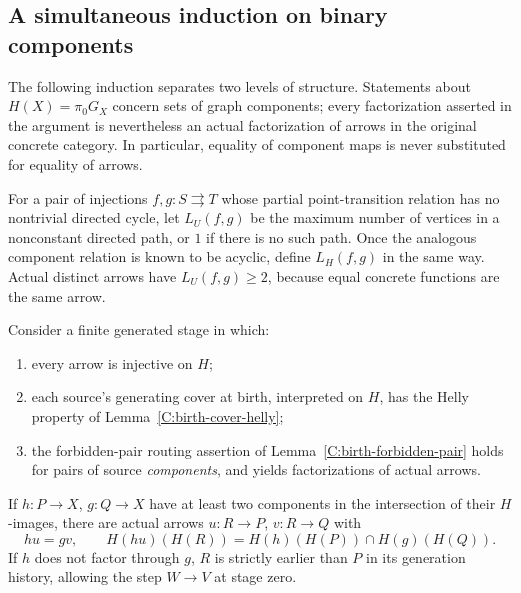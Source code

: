 \subsection{A simultaneous induction on binary components}

The following induction separates two levels of structure.
Statements about $H(X)=\pi_0G_X$ concern sets of graph components;
every factorization asserted in the argument is nevertheless an
actual factorization of arrows in the original concrete category.
In particular, equality of component maps is never substituted for
equality of arrows.

For a pair of injections $f,g:S\rightrightarrows T$ whose partial
point-transition relation has no nontrivial directed cycle, let
$L_U(f,g)$ be the maximum number of vertices in a nonconstant
directed path, or $1$ if there is no such path. Once the analogous
component relation is known to be acyclic, define $L_H(f,g)$ in
the same way. Actual distinct arrows have $L_U(f,g)\geq2$,
because equal concrete functions are the same arrow.

\begin{lemma}
\label{C:component-two-intersection}
Consider a finite generated stage in which:
\begin{enumerate}
\item every arrow is injective on $H$;
\item each source's generating cover at birth, interpreted on $H$,
has the Helly property of Lemma~\ref{C:birth-cover-helly};
\item the forbidden-pair routing assertion of
Lemma~\ref{C:birth-forbidden-pair} holds for pairs of source
\emph{components}, and yields factorizations of actual arrows.
\end{enumerate}
If $h:P\to X$, $g:Q\to X$ have at least two components in the
intersection of their $H$-images, there are actual arrows
$u:R\to P$, $v:R\to Q$ with
\[
 hu=gv,\qquad
 H(hu)(H(R))=H(h)(H(P))\cap H(g)(H(Q)).
 \tag{CI}\label{eq:component-intersection-span}
\]
If $h$ does not factor through $g$, $R$ is strictly earlier than
$P$ in its generation history, allowing the step $W\to V$ at
stage zero.
\end{lemma}

